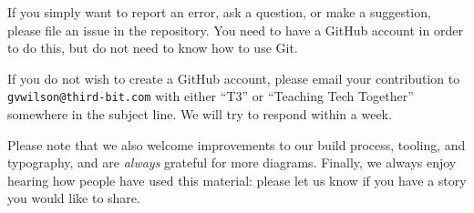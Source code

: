If you simply want to report an error, ask a question, or make a
suggestion, please file an issue in the repository. You need to have a GitHub account in
order to do this, but do not need to know how to use Git.

If you do not wish to create a GitHub account, please email your
contribution to \texttt{gvwilson@third-bit.com} with either
``T3'' or ``Teaching Tech Together'' somewhere in the subject line. We
will try to respond within a week.

Please note that we also welcome improvements to our build process, tooling, and typography,
and are \emph{always} grateful for more diagrams.
Finally, we always enjoy hearing how people have used this material:
please let us know if you have a story you would like to share.
